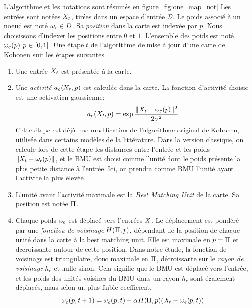 L'algorithme et les notations sont résumés en figure~\ref{fig:one_map_not}
Les entrées sont notées $X_t$, tirées dans un espace d'entrée $\mathcal{D}$. Le poids associé à un noeud est noté $\omega_e \in D$. Sa \emph{position} dans la carte est indexée par $p$. Nous choisissons d'indexer les positions entre $0$ et $1$. L'ensemble des poids est noté ${\omega_e(p), p \in [0,1]}$.
Une étape $t$ de l'algorithme de mise à jour d'une carte de Kohonen suit les étapes suivantes:
\begin{enumerate}
\item\label{enum:inp} Une entrée $X_t$ est présentée à la carte.
\item\label{enum:act} Une \emph{activité} $a_e(X_t,p)$ est calculée dans la carte. La fonction d'activité choisie est une activation gaussienne:
\begin{equation}\label{eq:act1som}
a_e(X_t,p) = \exp{\frac{\lVert X_t-\omega_{e}(p) \rVert ^2}{2\sigma^2}}
\end{equation}
Cette étape est déjà une modification de l'algorithme original de Kohonen, utilisée dans certains modèles de la littérature. 
Dans la version classique, on calcule lors de cette étape les distances entre l'entrée et les poids $\lVert X_t - \omega_e(p) \rVert$, et le BMU est choisi comme l'unité dont le poids présente la plus petite distance à l'entrée. 
Ici, on prendra comme BMU l'unité ayant l'activité la plus élevée.
\item\label{enum:bmu} L'unité ayant l'activité maximale est la \emph{Best Matching Unit} de la carte. Sa position est notée $\Pi$.
\item Chaque poids $\omega_e$ est déplacé vers l'entrées $X$. Le déplacement est pondéré par une \emph{fonction de voisinage} $H(\Pi,p)$, dépendant de la position de chaque unité dans la carte à la best matching unit. Elle est maximale en $p = \Pi$ et décroissante autour de cette position. Dans notre étude, la fonction de voisinage est triangulaire, donc maximale en $\Pi$, décroissante sur le \emph{rayon de voisinage} $h_e$ et nulle sinon. Cela signifie que le BMU est déplacé vers l'entrée, et les poids des unités voisines du BMU dans un rayon $h_e$ sont également déplacés, mais selon un plus faible coefficient.
\begin{equation}
\omega_e(p,t+1) = \omega_e(p,t) + \alpha H(\Pi,p)(X_t - \omega_e(p,t))
\label{eq:update}
\end{equation}
\end{enumerate}


